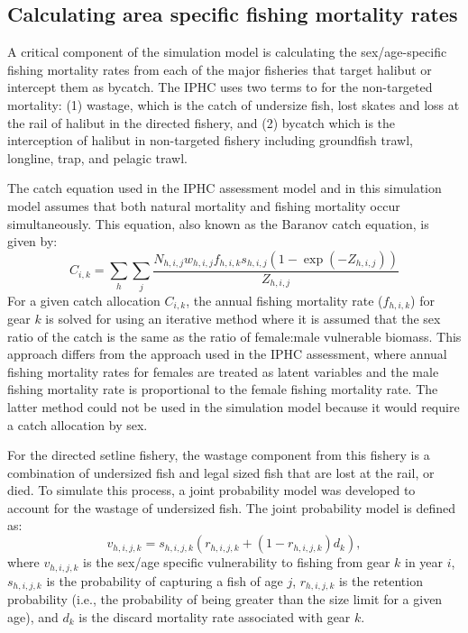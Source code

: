 \subsection{Calculating area specific fishing mortality rates} %
\label{sub:calculating_area_specific_fishing_mortality_rates}
A critical component of the simulation model is calculating the sex/age-specific fishing mortality rates from each of the major fisheries that target halibut or intercept them as bycatch.  The IPHC uses two terms to for the non-targeted mortality: (1) wastage, which is the catch of undersize fish, lost skates and loss at the rail of halibut in the directed fishery, and (2) bycatch which is the interception of halibut in non-targeted fishery including groundfish trawl, longline, trap, and pelagic trawl.

The catch equation used in the IPHC assessment model and in this simulation model assumes that both natural mortality and fishing mortality occur simultaneously.  This equation, also known as the Baranov catch equation, is given by:
\[
 C_{i,k} =\sum_h \sum_j \frac{N_{h,i,j} w_{h,i,j} f_{h,i,k} s_{h,i,j} (1-\exp(-Z_{h,i,j}))}{Z_{h,i,j}}
\]
For a given catch allocation $C_{i,k}$, the annual fishing mortality rate ($f_{h,i,k}$) for gear $k$ is solved for using an iterative method where it is assumed that the sex ratio of the catch is the same as the ratio of female:male vulnerable biomass.  This approach differs from the approach used in the IPHC assessment, where annual fishing mortality rates for females are treated as  latent variables and the male fishing mortality rate is proportional to the female fishing mortality rate.  The latter method could not be used in the simulation model  because it would require a catch allocation by sex.

For the directed setline fishery, the wastage component from this fishery is a combination of undersized fish and legal sized fish that are lost at the rail, or died.  To simulate this process, a joint probability model was developed to account for the wastage of undersized fish. The joint probability model is defined as:
\[
 v_{h,i,j,k} = s_{h,i,j,k}(r_{h,i,j,k}+(1-r_{h,i,j,k})d_{k}),
\]
where $v_{h,i,j,k}$ is the sex/age specific vulnerability to fishing from gear $k$ in year $i$, $s_{h,i,j,k}$ is the probability of capturing a fish of age $j$, $r_{h,i,j,k}$ is the retention probability (i.e., the probability of being greater than the size limit for a given age), and $d_{k}$ is the discard mortality rate associated with gear $k$.

